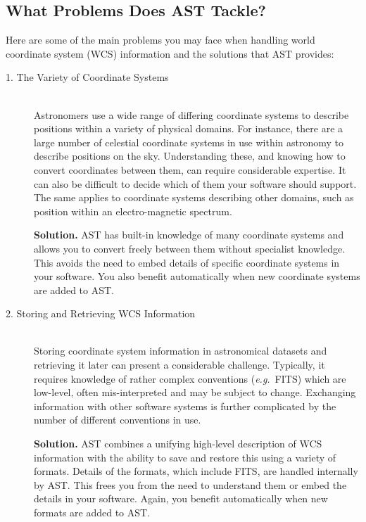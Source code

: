 \documentclass[twoside,11pt]{article}
\begin{document}

\subsection{What Problems Does AST Tackle?}

Here are some of the main problems you may face when handling world
coordinate system (WCS) information and the solutions that AST
provides:

\begin{description}
\item[1. The Variety of Coordinate Systems]\mbox{}\\
Astronomers use a wide range of differing coordinate systems to describe
positions within a variety of physical domains. For instance, there are a
large number of celestial coordinate systems in use within astronomy to
describe positions on the sky. Understanding these, and knowing how to
convert coordinates between them, can require considerable expertise. It
can also be difficult to decide which of them your software should support.
The same applies to coordinate systems describing other domains, such as
position within an electro-magnetic spectrum.

{\bf{Solution.}} AST has built-in knowledge of many coordinate systems
and allows you to convert freely between them without specialist
knowledge. This avoids the need to embed details of specific
coordinate systems in your software. You also benefit automatically
when new coordinate systems are added to AST.

\item[2. Storing and Retrieving WCS Information]\mbox{}\\
Storing coordinate system information in astronomical datasets and
retrieving it later can present a considerable challenge. Typically,
it requires knowledge of rather complex conventions
({\em{e.g.}}\ FITS) which are low-level, often mis-interpreted and may
be subject to change. Exchanging information with other software
systems is further complicated by the number of different conventions
in use.

{\bf{Solution.}} AST combines a unifying high-level description of WCS
information with the ability to save and restore this using a variety
of formats. Details of the formats, which include FITS, are handled
internally by AST. This frees you from the need to understand them or
embed the details in your software. Again, you benefit automatically
when new formats are added to AST.


\end{description}
\end{document}
